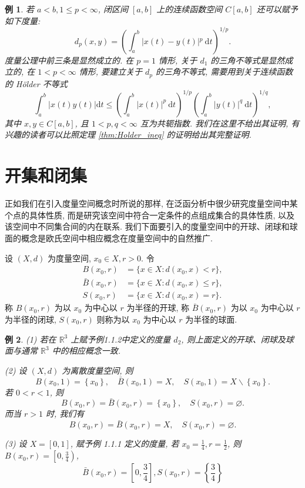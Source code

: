 \documentclass[openany]{ctexbook}
\theoremstyle{kaiti}
\theoremstyle{normal}
\newtheorem{example}{例}[section]
\begin{document}
\begin{example}
若 $a<b, 1 \leqslant p<\infty$, 闭区间 $[a, b]$ 上的连续函数空间 $C[a, b]$ 还可以赋予如下度量:
$$
d_{p}(x, y)=\left(\int_{a}^{b}|x(t)-y(t)|{ }^{p} \mathrm{~d} t\right)^{1 / p}.
$$
度量公理中前三条是显然成立的. 在 $p=1$ 情形, 关于 $d_1$ 的三角不等式是显然成立的, 在 $1<p<\infty$ 情形, 要建立关于 $d_{p}$ 的三角不等式, 需要用到关于连续函数的 Hölder 不等式
$$
\int_{a}^{b}|x(t) y(t)| \mathrm{d} t \leqslant\left(\int_{a}^{b}|x(t)|^{p} \mathrm{~d} t\right)^{1 / p}\left(\int_{a}^{b}|y(t)|^{q} \mathrm{~d} t\right)^{1 / q},
$$
其中 $x, y \in C[a, b]$, 且 $1<p, q<\infty$ 互为共轭指数. 我们在这里不给出其证明, 有兴趣的读者可以比照定理 \ref{thm:Holder_ineq} 的证明给出其完整证明.
\end{example}

\section{开集和闭集}

正如我们在引入度量空间概念时所说的那样, 在泛函分析中很少研究度量空间中某个点的具体性质, 而是研究该空间中符合一定条件的点组成集合的具体性质, 以及该空间中不同集合间的内在联系. 我们下面要引入的度量空间中的开球、闭球和球面的概念是欧氏空间中相应概念在度量空间中的自然推广.

设 $(X, d)$ 为度量空间, $x_0 \in X, r>0$. 令
$$
  \begin{aligned}
    B(x_0, r)&=\{x \in X: d(x_0, x)<r\}, \\
    \bar{B}(x_0, r)&=\{x \in X: d(x_0, x) \leqslant r\}, \\
    S(x_0, r)&=\{x \in X: d(x_0, x)=r\}.
  \end{aligned}
$$
称 $B\left(x_0, r\right)$ 为以 $x_0$ 为中心以 $r$ 为半径的开球, 称 $\bar{B}\left(x_0, r\right)$ 为以 $x_0$ 为中心以 $r$ 为半径的闭球, $S\left(x_0, r\right)$ 则称为以 $x_0$ 为中心以 $r$ 为半径的球面.

\begin{example}
(1) 若在 $\mathbb{R}^3$ 上赋予例1.1.2中定义的度量 $d_2$, 则上面定义的开球、闭球及球面与通常 $\mathbb{R}^3$ 中的相应概念一致.

(2) 设 $(X, d)$ 为离散度量空间, 则
$$
B\left(x_0, 1\right)=\left\{x_0\right\}, \quad \bar{B}\left(x_0, 1\right)=X, \quad S\left(x_0, 1\right)=X \backslash\left\{x_0\right\}.
$$
若 $0<r<1$, 则
$$
B\left(x_0, r\right)=\bar{B}\left(x_0, r\right)=\left\{x_0\right\}, \quad S\left(x_0, r\right)=\varnothing.
$$
而当 $r>1$ 时, 我们有
$$
B\left(x_0, r\right)=\bar{B}\left(x_0, r\right)=X, \quad S\left(x_0, r\right)=\varnothing.
$$

(3) 设 $X=[0,1]$, 赋予例 1.1.1 定义的度量, 若 $x_0=\frac{1}{4}, r=\frac{1}{2}$, 则 $B\left(x_0, r\right)=\left[0, \frac{3}{4}\right)$,
$$
\bar{B}\left(x_0, r\right)=\left[0, \frac{3}{4}\right], S\left(x_0, r\right)=\left\{\frac{3}{4}\right\}
$$
\end{example}
\end{document}

